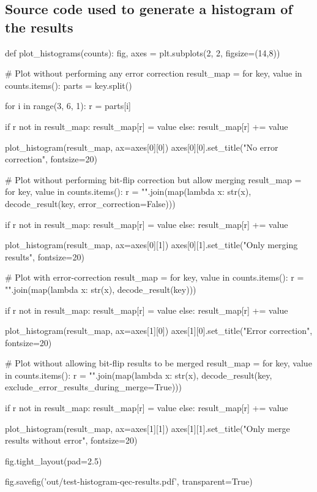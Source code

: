 \subsection{Source code used to generate a histogram of the results}
\label{subsec:code-histogram-results}

\begin{python}
def plot_histograms(counts):
    fig, axes = plt.subplots(2, 2, figsize=(14,8))

    # Plot without performing any error correction
    result_map = {}
    for key, value in counts.items():
        parts = key.split()

        for i in range(3, 6, 1):
            r = parts[i]

        if r not in result_map:
            result_map[r] = value
        else:
            result_map[r] += value

    plot_histogram(result_map, ax=axes[0][0])
    axes[0][0].set_title("No error correction", fontsize=20)

    # Plot without performing bit-flip correction but allow merging
    result_map = {}
    for key, value in counts.items():
        r = "".join(map(lambda x: str(x), decode_result(key, error_correction=False)))

        if r not in result_map:
            result_map[r] = value
        else:
            result_map[r] += value

    plot_histogram(result_map, ax=axes[0][1])
    axes[0][1].set_title("Only merging results", fontsize=20)

    # Plot with error-correction
    result_map = {}
    for key, value in counts.items():
        r = "".join(map(lambda x: str(x), decode_result(key)))

        if r not in result_map:
            result_map[r] = value
        else:
            result_map[r] += value

    plot_histogram(result_map, ax=axes[1][0])
    axes[1][0].set_title("Error correction", fontsize=20)

    # Plot without allowing bit-flip results to be merged
    result_map = {}
    for key, value in counts.items():
        r = "".join(map(lambda x: str(x), decode_result(key, exclude_error_results_during_merge=True)))

        if r not in result_map:
            result_map[r] = value
        else:
            result_map[r] += value

    plot_histogram(result_map, ax=axes[1][1])
    axes[1][1].set_title("Only merge results without error", fontsize=20)

    fig.tight_layout(pad=2.5)

    fig.savefig('out/test-histogram-qec-results.pdf', transparent=True)
\end{python}
